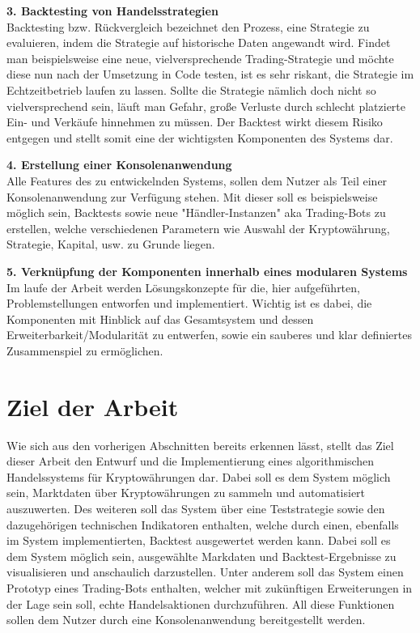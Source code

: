 \documentclass[oneside]{ausarbeitung}
\begin{document}
\textbf{3. Backtesting von Handelsstrategien} \\
Backtesting bzw. Rückvergleich bezeichnet den Prozess, eine Strategie zu evaluieren, indem die Strategie auf historische Daten angewandt wird. Findet man beispielsweise eine neue, vielversprechende Trading-Strategie und möchte diese nun nach der Umsetzung in Code testen, ist es sehr riskant, die Strategie im Echtzeitbetrieb laufen zu lassen. Sollte die Strategie nämlich doch nicht so vielversprechend sein, läuft man Gefahr, große Verluste durch schlecht platzierte Ein- und Verkäufe hinnehmen zu müssen. Der Backtest wirkt diesem Risiko entgegen und stellt somit eine der wichtigsten Komponenten des Systems dar. 

\textbf{4. Erstellung einer Konsolenanwendung} \\
Alle Features des zu entwickelnden Systems, sollen dem Nutzer als Teil einer Konsolenanwendung zur Verfügung stehen. Mit dieser soll es beispielsweise möglich sein, Backtests sowie neue "Händler-Instanzen" aka Trading-Bots zu erstellen, welche verschiedenen Parametern wie Auswahl der Kryptowährung, Strategie, Kapital, usw. zu Grunde liegen.

\textbf{5. Verknüpfung der Komponenten innerhalb eines modularen Systems} \\
Im laufe der Arbeit werden Lösungskonzepte für die, hier aufgeführten, Problemstellungen entworfen und implementiert. Wichtig ist es dabei, die Komponenten mit Hinblick auf das Gesamtsystem und dessen Erweiterbarkeit/Modularität zu entwerfen, sowie ein sauberes und klar definiertes Zusammenspiel zu ermöglichen. 

\section{Ziel der Arbeit}
\label{sec:ziel}

Wie sich aus den vorherigen Abschnitten bereits erkennen lässt, stellt das Ziel dieser Arbeit den Entwurf und die Implementierung eines algorithmischen Handelssystems für Kryptowährungen dar. Dabei soll es dem System möglich sein, Marktdaten über Kryptowährungen zu sammeln und automatisiert auszuwerten. Des weiteren soll das System über eine Teststrategie sowie den dazugehörigen technischen Indikatoren enthalten, welche durch einen, ebenfalls im System implementierten, Backtest ausgewertet werden kann. Dabei soll es dem System möglich sein, ausgewählte Markdaten und Backtest-Ergebnisse zu visualisieren und anschaulich darzustellen. Unter anderem soll das System einen Prototyp eines Trading-Bots enthalten, welcher mit zukünftigen Erweiterungen in der Lage sein soll, echte Handelsaktionen durchzuführen. All diese Funktionen sollen dem Nutzer durch eine Konsolenanwendung bereitgestellt werden.
\end{document}
